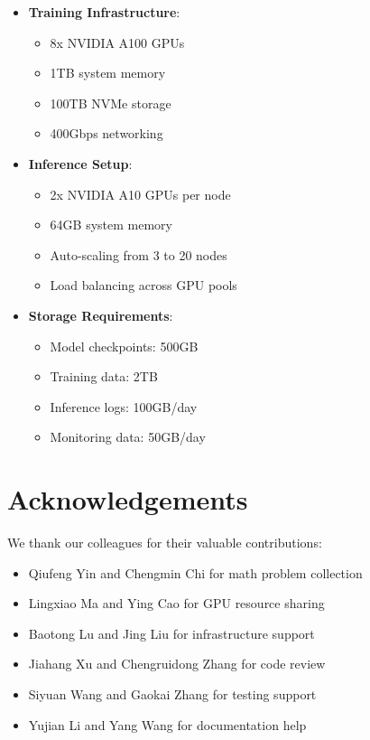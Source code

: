 \begin{itemize}
    \item \textbf{Training Infrastructure}:
    \begin{itemize}
        \item 8x NVIDIA A100 GPUs
        \item 1TB system memory
        \item 100TB NVMe storage
        \item 400Gbps networking
    \end{itemize}

    \item \textbf{Inference Setup}:
    \begin{itemize}
        \item 2x NVIDIA A10 GPUs per node
        \item 64GB system memory
        \item Auto-scaling from 3 to 20 nodes
        \item Load balancing across GPU pools
    \end{itemize}

    \item \textbf{Storage Requirements}:
    \begin{itemize}
        \item Model checkpoints: 500GB
        \item Training data: 2TB
        \item Inference logs: 100GB/day
        \item Monitoring data: 50GB/day
    \end{itemize}
\end{itemize}

\section{Acknowledgements}

We thank our colleagues for their valuable contributions:

\begin{itemize}
    \item Qiufeng Yin and Chengmin Chi for math problem collection
    \item Lingxiao Ma and Ying Cao for GPU resource sharing
    \item Baotong Lu and Jing Liu for infrastructure support
    \item Jiahang Xu and Chengruidong Zhang for code review
    \item Siyuan Wang and Gaokai Zhang for testing support
    \item Yujian Li and Yang Wang for documentation help
\end{itemize}

